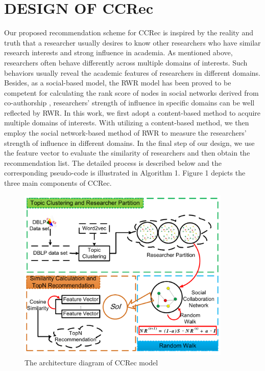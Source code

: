 \documentclass[review]{elsarticle}
\begin{document}
\section{DESIGN OF CCRec}
Our proposed recommendation scheme for CCRec is inspired by the reality and truth that a researcher usually desires to know other researchers who have similar research interests and strong influence in academia. As mentioned above, researchers often behave differently across multiple domains of interests. Such behaviors usually reveal the academic features of researchers in different domains. Besides, as a social-based model, the RWR model has been proved to be competent for calculating the rank score of nodes in social networks derived from co-authorship \cite{li2014acrec}, researchers' strength of influence in specific domains can be well reflected by RWR. In this work, we first adopt a content-based method to acquire multiple domains of interests. With utilizing a content-based method, we then employ the social network-based method of RWR to measure the researchers' strength of influence in different domains. In the final step of our design, we use the feature vector to evaluate the similarity of researchers and then obtain the recommendation list. The detailed process is described below and the corresponding pseudo-code is illustrated in Algorithm 1. Figure 1 depicts the three main components of CCRec.


\begin{figure}
\centering
\includegraphics [width=4in]{Fig1.pdf}
\caption{The architecture diagram of CCRec model}
\end{figure}
\end{document}
